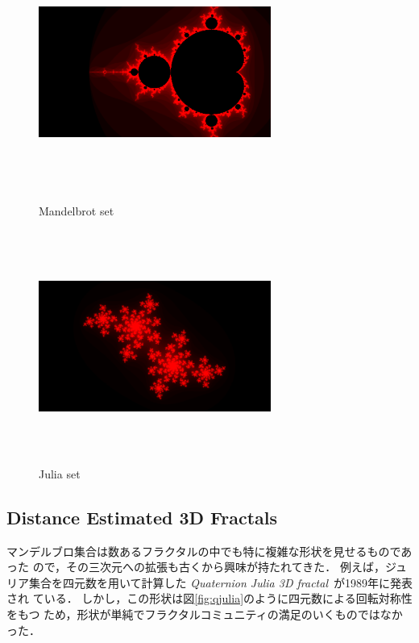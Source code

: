 \begin{figure}[htbp]
 \begin{minipage}{0.49\hsize}
  \center
   \includegraphics[width=3in, height=3in, keepaspectratio]{../img/fractal/mandelbrot.pdf}
   \caption{Mandelbrot set}
   \label{fig:mandelbrot}
 \end{minipage}
 \begin{minipage}{0.49\hsize}
  \center
  \includegraphics[width=3in, height=3in, keepaspectratio]{../img/fractal/julia.pdf}
  \caption{Julia set}
  \label{fig:julia}
 \end{minipage}
\end{figure}

\subsection{Distance Estimated 3D Fractals}

マンデルブロ集合は数あるフラクタルの中でも特に複雑な形状を見せるものであった
ので，その三次元への拡張も古くから興味が持たれてきた．
例えば，ジュリア集合を四元数を用いて計算した
\textit{Quaternion Julia 3D fractal}~\cite{hart1989ray}が1989年に発表され
ている．
しかし，この形状は図\ref{fig:qjulia}のように四元数による回転対称性をもつ
ため，形状が単純でフラクタルコミュニティの満足のいくものではなかった．

